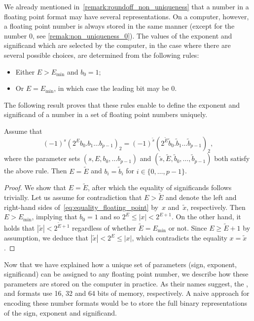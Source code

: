 We already mentioned  in~\cref{remark:roundoff_non_uniqueness} that
a number in a floating point format may have several representations.
On a computer, however, a floating point number is always stored in the same manner
(except for the number 0, see \cref{remak:non_uniqueness_0}).
The values of the exponent and significand which are selected by the computer,
in the case where there are several possible choices,
are determined from the following rules:
\begin{itemize}
    \item Either $E > E_{\min}$ and $b_0 = 1$;
    \item Or $E = E_{\min}$, in which case the leading bit may be 0.
\end{itemize}
The following result proves that these rules enable to define the exponent and significand of a number in a set of floating point numbers uniquely.
\begin{proposition}
    \label{prop:uniqueness_standard_representation}
    Assume that
    \begin{equation}
        \label{eq:equality_floating_point}
        (-1)^s (2^{E} b_0.b_1\dots b_{p-1})_2 = (-1)^{\widetilde s} (2^{\widetilde E} \widetilde b_0. \widetilde b_1\dots \widetilde b_{p-1})_2,
    \end{equation}
    where the parameter sets $(s, E, b_0, \dots b_{p-1})$ and $(\widetilde s, \widetilde E, \widetilde b_0, \dots, \widetilde b_{p-1})$ both satisfy the above rule.
    Then $E = \widetilde E$ and $b_i = \widetilde b_i$ for $i \in \{0, \dots, p-1\}$.
\end{proposition}
\begin{proof}
    We show that $E = \widetilde E$,
    after which the equality of significands follows trivially.
    Let us assume for contradiction that $E > \widetilde E$
    and denote the left and right-hand sides of~\eqref{eq:equality_floating_point} by~$x$ and~$\widetilde x$, respectively.
    Then~$E > E_{\min}$, implying that $b_0 = 1$ and so $2^{E} \leq |x| < 2^{E+1}$.
    On the other hand, it holds that $|\widetilde x| < 2^{\widetilde E+1}$ regardless of whether $\widetilde E = E_{\min}$ or not.
    Since $E \geq \widetilde E + 1$ by assumption,
    we deduce that $|\widetilde x| < 2^E \leq |x|$,
    which contradicts the equality $x = \widetilde x$.
\end{proof}

Now that we have explained how
a unique set of parameters (sign, exponent, significand) can be assigned to any floating point number,
we describe how these parameters are stored on the computer in practice.
As their names suggest, the ,  and  formats use 16, 32 and 64 bits of memory, respectively.
A naive approach for encoding these number formats would be to store the full binary representations of the sign, exponent and significand.

